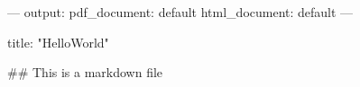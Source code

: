 ---
output:
  pdf_document: default
  html_document: default
---

title: "HelloWorld"

## This is a markdown file